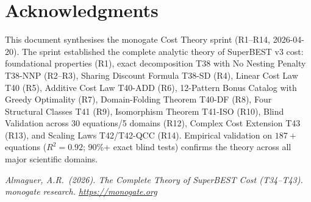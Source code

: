 \documentclass[12pt,a4paper]{article}
\theoremstyle{definition}
\begin{document}
\section*{Acknowledgments}

This document synthesises the monogate Cost Theory sprint (R1--R14,
2026-04-20).  The sprint established the complete analytic theory of
SuperBEST v3 cost: foundational properties (R1), exact decomposition T38
with No Nesting Penalty T38-NNP (R2--R3), Sharing Discount Formula T38-SD
(R4), Linear Cost Law T40 (R5), Additive Cost Law T40-ADD (R6), 12-Pattern
Bonus Catalog with Greedy Optimality (R7), Domain-Folding Theorem T40-DF
(R8), Four Structural Classes T41 (R9), Isomorphism Theorem T41-ISO (R10),
Blind Validation across 30 equations/5 domains (R12), Complex Cost
Extension T43 (R13), and Scaling Laws T42/T42-QCC (R14).  Empirical
validation on $187+$ equations ($R^2=0.92$; 90\%+ exact blind tests) confirms
the theory across all major scientific domains.

\bigskip
\noindent\textit{Almaguer, A.R.\ (2026).
The Complete Theory of SuperBEST Cost (T34--T43).
monogate research. \url{https://monogate.org}}
\end{document}
